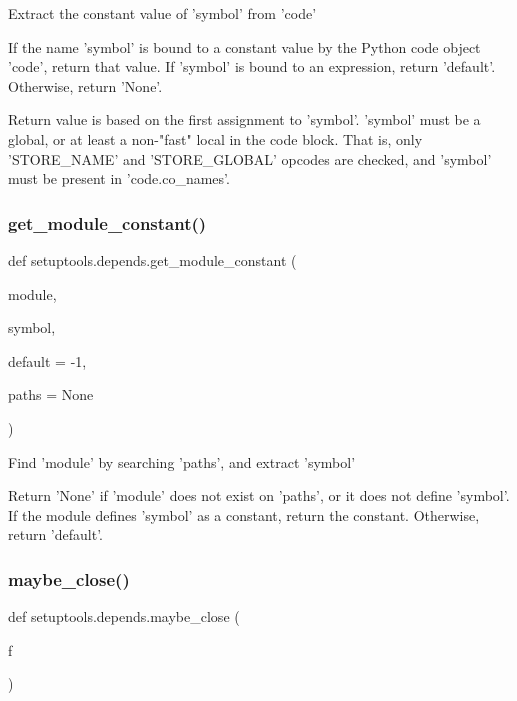 \begin{DoxyVerb}Extract the constant value of 'symbol' from 'code'

If the name 'symbol' is bound to a constant value by the Python code
object 'code', return that value.  If 'symbol' is bound to an expression,
return 'default'.  Otherwise, return 'None'.

Return value is based on the first assignment to 'symbol'.  'symbol' must
be a global, or at least a non-"fast" local in the code block.  That is,
only 'STORE_NAME' and 'STORE_GLOBAL' opcodes are checked, and 'symbol'
must be present in 'code.co_names'.
\end{DoxyVerb}
 \mbox{\label{namespacesetuptools_1_1depends_a5a13c841cb5ec0ec368eb437b3e7c615}} 
\subsubsection{\texorpdfstring{get\+\_\+module\+\_\+constant()}{get\_module\_constant()}}
{\footnotesize\ttfamily def setuptools.\+depends.\+get\+\_\+module\+\_\+constant (\begin{DoxyParamCaption}\item[{}]{module,  }\item[{}]{symbol,  }\item[{}]{default = {\ttfamily -\/1},  }\item[{}]{paths = {\ttfamily None} }\end{DoxyParamCaption})}

\begin{DoxyVerb}Find 'module' by searching 'paths', and extract 'symbol'

Return 'None' if 'module' does not exist on 'paths', or it does not define
'symbol'.  If the module defines 'symbol' as a constant, return the
constant.  Otherwise, return 'default'.\end{DoxyVerb}
 \mbox{\label{namespacesetuptools_1_1depends_a31c80f31ba714fa03597dedf762d244c}} 
\subsubsection{\texorpdfstring{maybe\+\_\+close()}{maybe\_close()}}
{\footnotesize\ttfamily def setuptools.\+depends.\+maybe\+\_\+close (\begin{DoxyParamCaption}\item[{}]{f }\end{DoxyParamCaption})}

